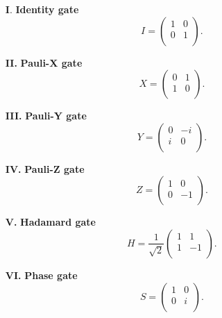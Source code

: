\documentclass[onecolumn,10pt,cleanfoot]{asme2ej}
\begin{document}
\begin{enumerate}
	\item[\textbf{I}.] \textbf{Identity gate}
		\begin{equation*}
			I = \begin{pmatrix}
			1 & 0 \\
			0 & 1 \\
		\end{pmatrix}.
	\end{equation*}

	\item[\textbf{II.}] \textbf{Pauli-X gate}
		\begin{equation*}
			X = \begin{pmatrix}
			0 & 1 \\
			1 & 0 \\
		\end{pmatrix}.
	\end{equation*}

	\item[\textbf{III.}] \textbf{Pauli-Y gate}
		\begin{equation*}
			Y = \begin{pmatrix}
			0 & -i \\
			i & 0 \\
		\end{pmatrix}.
	\end{equation*}

	\item[\textbf{IV.}] \textbf{Pauli-Z gate}
		\begin{equation*}
			Z = \begin{pmatrix}
			1 & 0 \\
			0 & -1 \\
		\end{pmatrix}.
	\end{equation*}

	\item[\textbf{V.}] \textbf{Hadamard gate}
		\begin{equation*}
			H = \frac{1}{\sqrt{2}} \begin{pmatrix}
			1 & 1 \\
			1 & -1 \\
		\end{pmatrix}.
	\end{equation*}

	\item[\textbf{VI.}] \textbf{Phase gate}
		\begin{equation*}
			S = \begin{pmatrix}
			1 & 0 \\
			0 & i \\
		\end{pmatrix}.
	\end{equation*}

\end{enumerate}
\end{document}
